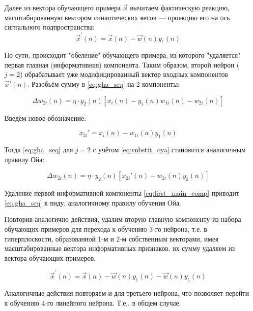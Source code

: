 \documentclass{article}
\numberwithin{equation}{subsection}
\begin{document}
Далее из вектора обучающего примера $\vec{x}$ вычитаем фактическую реакцию, масштабированную вектором
синаптических весов --- проекцию его на ось сигнального подпространства:
\begin{equation}
    \vec{x}^\prime(n) = \vec{x}(n) - \vec{w}(n) y_1(n)
    \label{eq:first_main_comp}
\end{equation}

По сути, происходит "обеление" обучающего примера, из которого "удаляется" первая главная 
(информативная) компонента. Таким образом, второй нейрон ($j=2$) обрабатывает уже 
модифицированный вектор входных компонентов $\vec{x}'(n)$.
Разобьём сумму в \ref{eq:gha_seq} на 2 компоненты:

\begin{equation}
    \Delta w_{2i}(n) = \eta \cdot y_2(n) \left[
        x_i(n) - y_1(n) w_{1i}(n) - w_{2i}(n)
    \right]
\end{equation}

Введём новое обозначение:

\begin{equation}
    x_{2i}' = x_i(n) - w_{1i}(n) y_1(n)
    \label{eq:substit_oya}
\end{equation}

Тогда \ref{eq:gha_seq} для $j=2$ с учётом \ref{eq:substit_oya} становится аналогичным правилу Ойа:

\begin{equation}
    \Delta w_{2i}(n) = \eta \cdot y_2(n) 
    \left[
        x_{2i}'(n) - w_{2i}(n) y_2(n)
    \right]
\end{equation}

Удаление первой информативной компоненты \ref{eq:first_main_comp} приводит \ref{eq:gha_seq} 
к виду, аналогичному правилу обучения Ойа.

Повторив аналогично действия, удалим вторую главную компоненту из набора обучающих примеров 
для перехода к обучению 3-го нейрона, т.е. в гиперплоскости, образованной 1-м и 2-м собственным 
векторами, имея масштабированные вектора информативных признаков, их сумму удаляем из вектора 
обучающих примеров.

\begin{equation}
    \vec{x}^\prime(n) = \vec{x}(n) - \vec{w}(n) y_1(n) - \vec{w}(n) y_1(n) 
\end{equation}

Аналогичные действия повторяем и для третьего нейрона, что позволяет перейти к обучению 4-го
линейного нейрона. Т.е., в общем случае:
\end{document}
